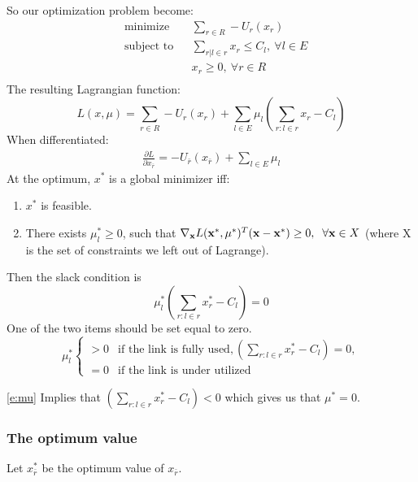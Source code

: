 So our optimization problem become:
\begin{equation}
\begin{aligned}
& {\text{minimize}}
& &  \sum_{r \in R} - U_{r}(x_{r}) \\
& \text{subject to}
& & \sum\limits_{r|l \in r} x_{r} \leq C_{l},\ \forall l \in E\\
&      &&  x_{r} \geq 0,\ \forall r \in R\\
\end{aligned}
\label{Min}
\end{equation}
The resulting Lagrangian function:
\begin{equation} 
L(x,\mu)= \sum_{r \in R} - U_{r}(x_{r}) + \sum_{l \in E} \mu_l \left(\sum_{r:l \in r} x_r - C_l\right) 
\end{equation}
When differentiated:
\begin{equation}
\label{Derivative}
\begin{aligned}
\frac{\partial L}{\partial x_{\bar{r}}}= - U_{\bar{r}}(x_{\bar{r}}) + \sum_{l \in E} \mu_l
\end{aligned}
\end{equation}
At the optimum, $x^*$ is a global minimizer iff:
\begin{enumerate}
	\item $x^*$ is feasible.
	\item There exists  $\mu^*_l  \geq 0$, such that $\nabla_{\mathbf{x}} L(\mathbf{x}^*,\mu^*)^T (\mathbf{x} - \mathbf{x}^*) \ge 0,  \;\; \forall \mathbf{x} \in X$   (where X is the set of constraints we left out of Lagrange).
\end{enumerate}

Then the slack condition is
 \begin{equation}
\label{e:mu}
\mu^*_l (\sum_{r:l \in r} x^*_r - C_l) = 0
\end{equation} 
One of the two items should be set equal to zero.
\begin{equation}
\mu^*_l
\begin{cases}
>0  & \mbox{if the link is fully used},(\sum_{r:l \in r} x^*_r - C_l) = 0, \\
=0  &\mbox{if the link is under utilized}
\end{cases}
\end{equation}

\eqref{e:mu} Implies that $(\sum_{r:l \in r} x^*_r - C_l) < 0$ which gives us that $\mu^* = 0$.

\subsubsection{The optimum value}
Let $x^*_{\bar r}$ be the optimum value of $x_{\bar r}$.

